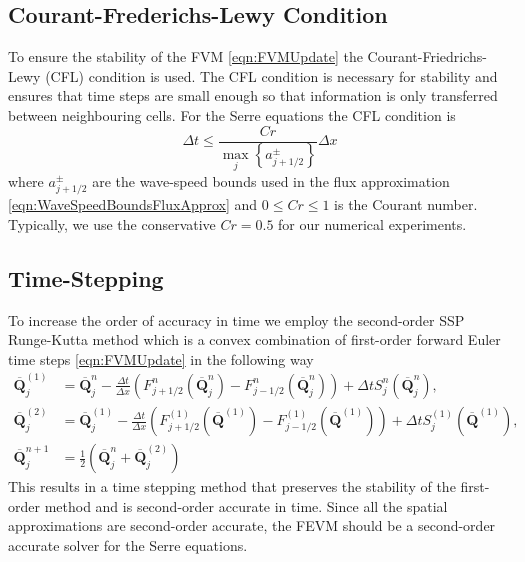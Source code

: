 \documentclass[times]{elsarticle}
\newcommand{\vecn}[1]{\boldsymbol{#1}}
\begin{document}
\subsection{Courant-Frederichs-Lewy Condition}
To ensure the stability of the FVM \eqref{eqn:FVMUpdate} the Courant-Friedrichs-Lewy (CFL) condition \cite{Courant-etal-1967-215} is used. The CFL condition is necessary for stability and ensures that time steps are small enough so that information is only transferred between neighbouring cells. For the Serre equations the CFL condition is 
\begin{equation}
\Delta t \le \frac{Cr }{\max_{j} \left\lbrace a^\pm_{j+1/2} \right\rbrace} \Delta x
\label{eqn:CFLcond}
\end{equation}
where $a^\pm_{j+1/2} $ are the wave-speed bounds used in the flux approximation \eqref{eqn:WaveSpeedBoundsFluxApprox} and $0\le Cr \le 1$ is the Courant number. Typically, we use the conservative $Cr = 0.5$ for our numerical experiments.

\subsection{Time-Stepping}
To increase the order of accuracy in time we employ the second-order SSP Runge-Kutta method \cite{Gottlieb-etal-2003-89} which is a convex combination of first-order forward Euler time steps \eqref{eqn:FVMUpdate} in the following way
\begin{subequations}
	\begin{align}
\overline{\vecn{Q} }^{(1)}_j &= \overline{\vecn{Q} }^{n}_j - \frac{\Delta t}{\Delta x} \left(F^n_{j+1/2}\left(\overline{\vecn{Q} }^{n}_j \right) - F^n_{j-1/2}\left(\overline{\vecn{Q} }^{n}_j \right) \right) + \Delta t S^n_j\left(\overline{\vecn{Q} }^{n}_j\right),\\
\overline{\vecn{Q} }^{(2)}_j &= \overline{\vecn{Q} }^{(1)}_j - \frac{\Delta t}{\Delta x} \left(F^{(1)}_{j+1/2}\left(\overline{\vecn{Q} }^{(1)} \right) - F^{(1)}_{j-1/2}\left(\overline{\vecn{Q} }^{(1)} \right) \right) + \Delta t S^{(1)}_j\left(\overline{\vecn{Q} }^{(1)} \right),\\
	\overline{\vecn{Q} }^{n+1}_j &= \frac{1}{2} \left( \overline{\vecn{Q} }^n_j +  \overline{\vecn{Q} }_j^{(2)}  \right)
	\end{align}
	\label{eqn:SSPRKStep1}
\end{subequations}
This results in a time stepping method that preserves the stability of the first-order method and is second-order accurate in time. Since all the spatial approximations are second-order accurate, the FEVM should be a second-order accurate solver for the Serre equations. 
\end{document}
